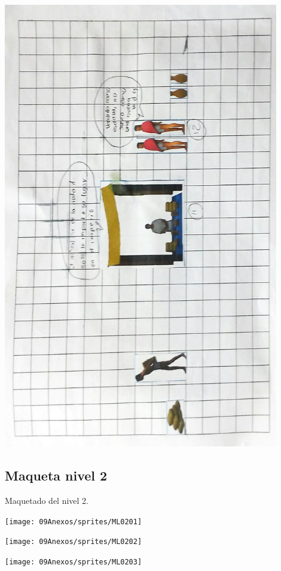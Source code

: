 \begin{center}
\includegraphics[width=0.9\textwidth]{09Anexos/sprites/M0105.jpg}
\end{center}


\subsection{Maqueta nivel 2}
Maquetado del nivel 2.
\begin{center}
\texttt{[image: 09Anexos/sprites/ML0201]}
\end{center}

\begin{center}
\texttt{[image: 09Anexos/sprites/ML0202]}
\end{center}

\begin{center}
\texttt{[image: 09Anexos/sprites/ML0203]}
\end{center}

